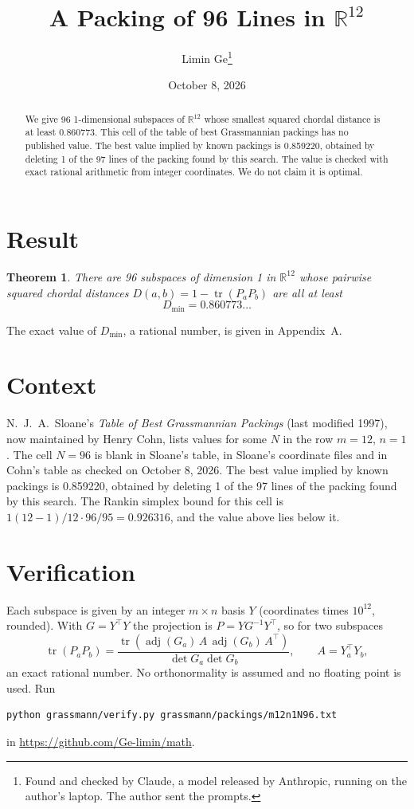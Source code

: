 \documentclass[11pt,a4paper]{article}
\title{A Packing of 96 Lines in $\mathbb{R}^{12}$}
\author{Limin Ge\thanks{Found and checked by Claude, a model released by Anthropic, running on the author's laptop. The author sent the prompts.}}
\date{October 8, 2026}
\newtheorem*{theorem}{Theorem}
\begin{document}
\maketitle
\begin{abstract}
We give 96 1-dimensional subspaces of $\mathbb{R}^{12}$ whose smallest squared chordal distance is at least 0.860773. This cell of the table of best Grassmannian packings has no published value. The best value implied by known packings is 0.859220, obtained by deleting 1 of the 97 lines of the packing found by this search. The value is checked with exact rational arithmetic from integer coordinates. We do not claim it is optimal.
\end{abstract}

\section{Result}
\begin{theorem}
There are 96 subspaces of dimension 1 in $\mathbb{R}^{12}$ whose pairwise squared chordal distances $D(a,b) = 1 - \operatorname{tr}(P_aP_b)$ are all at least
\[ D_{\min} = 0.860773\ldots \]
\end{theorem}
The exact value of $D_{\min}$, a rational number, is given in Appendix~A.


\section{Context}
N.~J.~A.~Sloane's \emph{Table of Best Grassmannian Packings} (last modified 1997), now maintained by Henry Cohn, lists values for some $N$ in the row $m=12$, $n=1$. The cell $N=96$ is blank in Sloane's table, in Sloane's coordinate files and in Cohn's table as checked on October 8, 2026. The best value implied by known packings is 0.859220, obtained by deleting 1 of the 97 lines of the packing found by this search. The Rankin simplex bound for this cell is $1(12-1)/12\cdot 96/95 = 0.926316$, and the value above lies below it.


\section{Verification}
Each subspace is given by an integer $m\times n$ basis $Y$ (coordinates times $10^{12}$, rounded). With $G=Y^\top Y$ the projection is $P=YG^{-1}Y^\top$, so for two subspaces
\[ \operatorname{tr}(P_aP_b)=\frac{\operatorname{tr}(\operatorname{adj}(G_a)\,A\,\operatorname{adj}(G_b)\,A^\top)}{\det G_a\det G_b},\qquad A=Y_a^\top Y_b, \]
an exact rational number. No orthonormality is assumed and no floating point is used. Run
\begin{verbatim}
python grassmann/verify.py grassmann/packings/m12n1N96.txt
\end{verbatim}
in \url{https://github.com/Ge-limin/math}.
\end{document}
